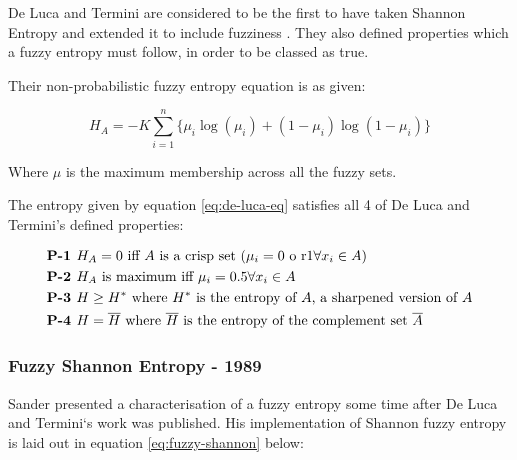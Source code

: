 De Luca and Termini are considered to be the first to have taken Shannon Entropy and extended it to include fuzziness \cite{DeLuca_Termini_1972}. They also defined properties which a fuzzy entropy must follow, in order to be classed as true.

Their non-probabilistic fuzzy entropy equation is as given:

\begin{equation}\label{eq:de-luca-eq}
  H_A = -K \displaystyle\sum_{i=1}^{n}{\{\mu_i\log(\mu_i) + (1 - \mu_i)\log(1 - \mu_i)\}}
\end{equation}

Where $\mu$ is the maximum membership across all the fuzzy sets.

The entropy given by equation \eqref{eq:de-luca-eq} satisfies all 4 of De Luca and Termini's defined properties:

  \begin{subequations} \label{eq:de-luca-cond}
    \begin{align}
      &\text{\textbf{P-1 }} H_A = 0 \text{ iff } A \text{ is a crisp set (}\mu_i = 0 \text{ o r} 1 \forall x_i \in A\text{)} \\
      &\text{\textbf{P-2 }} H_A \text{ is maximum iff }\mu_i = 0.5 \forall x_i \in A \\
      &\text{\textbf{P-3 }} H \geq H^\ast\text{ where }H^\ast\text{ is the entropy of }A\text{, a sharpened version of } A \\
      &\text{\textbf{P-4 }} H = \overline{H}\text{ where }\overline{H}\text{ is the entropy of the complement set }\overline{A}
    \end{align}
  \end{subequations}



\subsubsection{Fuzzy Shannon Entropy - 1989}

Sander \cite{Sander_1989} presented a characterisation of a fuzzy entropy some time after De Luca and Termini`s work was published. His implementation of Shannon fuzzy entropy is laid out in equation \eqref{eq:fuzzy-shannon} below:

